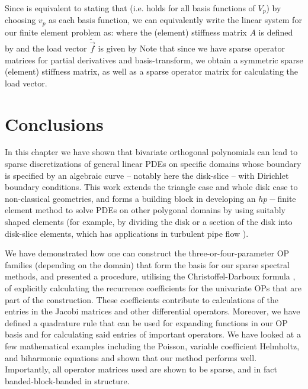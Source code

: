Since  is equivalent to stating that
(i.e. holds for all basis functions of $V_p$) by choosing $v_p$ as each basis function, we can equivalently write the linear system for our finite element problem as:
where the (element) stiffness matrix $A$ is defined by 
and the load vector $\tilde{\vec{f}}$ is given by 
Note that since we have sparse operator matrices for partial derivatives and basis-transform, we obtain a symmetric sparse (element) stiffness matrix, as well as a sparse operator matrix for calculating the load vector.



\section{Conclusions}

In this chapter we have shown that bivariate orthogonal polynomials can lead to sparse discretizations of general linear PDEs on specific domains whose boundary is specified by an algebraic curve -- notably here the disk-slice -- with Dirichlet boundary conditions. This work extends the triangle case \cite{beuchler2006new, li2010optimal, olver2019triangle} and whole disk case \cite{boyd2011comparing, vasil2016tensor} to non-classical geometries, and forms a building block in developing an $hp-$finite element method to solve PDEs on other polygonal domains by using suitably shaped elements (for example, by dividing the disk or a section of the disk into disk-slice elements, which has applications in turbulent pipe flow \cite{eggels1994fully, kerswell2005recent, vasil2016tensor}).

We have demonstrated how one can construct the three-or-four-parameter OP families (depending on the domain) that form the basis for our sparse spectral methods, and presented a procedure, utilising the Christoffel-Darboux formula \cite[18.2.2]{DLMF}, of explicitly calculating the recurrence coefficients for the univariate OPs that are part of the construction. These coefficients contribute to calculations of the entries in the Jacobi matrices and other differential operators. Moreover, we have defined a quadrature rule that can be used for expanding functions in our OP basis and for calculating said entries of important operators. We have looked at a few mathematical examples including the Poisson, variable coefficient Helmholtz, and biharmonic equations and shown that our method performs well. Importantly, all operator matrices used are shown to be sparse, and in fact banded-block-banded in structure.

